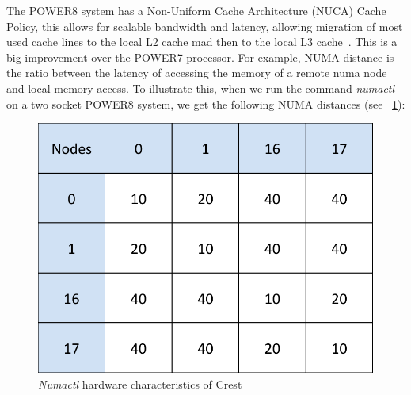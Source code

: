 The POWER8 system has a Non-Uniform Cache Architecture (NUCA) Cache Policy, this allows for scalable bandwidth and latency, allowing migration of most used cache lines to the local L2 cache mad then to the local L3 cache~\cite{IBM_P8}. This is a big improvement over the POWER7 processor. For example, NUMA distance is the ratio between the latency of accessing the memory of a remote numa node and local memory access. To illustrate this,  when we run the command \textit{numactl} on a two socket POWER8 system, we get the following 
NUMA distances (see ~\ref{fig:crest}): 

\begin{figure}[h]
  \centering
  \includegraphics[height=0.3\textwidth]{./Images/crest.pdf}
       \caption{\textit{Numactl} hardware characteristics of Crest}
       \label{fig:crest}
\end{figure}



 